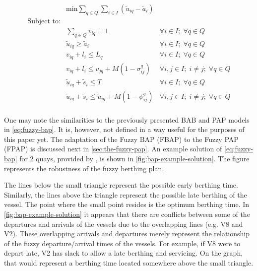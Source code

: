\documentclass[11pt,a4paper,final]{article}
\begin{document}
\begin{equation}
\label{eq:fuzzy-bap}
\begin{array}{lll}
                   & \text{min} \sum_{q \in Q}\sum_{i \in I} (\tilde{u}_{iq} - \tilde{a}_i)           &                                \\
\text{Subject to:} &                                                             &                                    \\
                   & \sum_{q \in Q} v_{iq} = 1                                          & \forall i \in I;\; \forall q \in Q               \\
                   & \tilde{u}_{iq} \ge \tilde{a}_i                                 & \forall i \in I;\; \forall q \in Q                \\
                   & v_{iq} + l_i \le L_q                                           & \forall i \in I;\; \forall q \in Q                \\
                   & v_{iq} + l_i \le v_{jq} + M(1-\sigma^q_{ij})                           & \forall i,j \in I;\; i \ne j;\; \forall q \in Q   \\
                   & \tilde{u}_{iq} + \tilde{s}_i \le T                             & \forall i \in I;\; \forall q \in Q                \\
                   & \tilde{u}_{iq} + \tilde{s}_i \le \tilde{u}_{iq} + M(1-\psi^q_{ij})   & \forall i,j \in I;\; i \ne j;\; \forall q \in Q \\
\end{array}
\end{equation}

One may note the similarities to the previously presented BAB and PAP models in \ref{eq:fuzzy-bap}. It is, however, not
defined in a way useful for the purposes of this paper yet. The adaptation of the Fuzzy BAP (FBAP) to the Fuzzy PAP
(FPAP) is discussed next in \ref{sec:the-fuzzy-pap}. An example solution of \ref{eq:fuzzy-bap} for 2 quays, provided by
\cite{bello-2019-fuzzy-activ}, is shown in \ref{fig:bap-example-solution}. The figure represents the robustness of the fuzzy
berthing plan.

The lines below the small triangle represent the possible early berthing time. Similarly, the lines above the triangle
represent the possible late berthing of the vessel. The point where the small point resides is the optimum berthing
time. In \ref{fig:bap-example-solution} it appears that there are conflicts between some of the departures and arrivals of the
vessels due to the overlapping lines (e.g. V8 and V2). These overlapping arrivals and departures merely represent the
relationship of the fuzzy departure/arrival times of the vessels. For example, if V8 were to depart late, V2 has slack
to allow a late berthing and servicing. On the graph, that would represent a berthing time located somewhere above the
small triangle.
\end{document}
